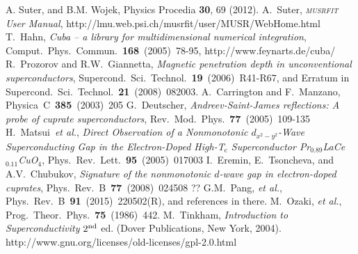 \documentclass[twoside]{article}
\newcommand{\musrfit}{\textsc{musrfit}\xspace}
\begin{document}

\begin{thebibliography}{1}

 A. Suter, and B.M. Wojek, Physics Procedia \textbf{30}, 69 (2012). 
                  A.~Suter, \textit{\musrfit User Manual}, http://lmu.web.psi.ch/musrfit/user/MUSR/WebHome.html
 T.~Hahn, \textit{Cuba -- a library for multidimensional numerical integration}, Comput.~Phys.~Commun.~\textbf{168}~(2005)~78-95, http://www.feynarts.de/cuba/
 R.~Prozorov and R.W.~Giannetta, \textit{Magnetic penetration depth in unconventional superconductors}, Supercond.\ Sci.\ Technol.\ \textbf{19}~(2006)~R41-R67, and Erratum in Supercond.\ Sci.\ Technol.\ \textbf{21}~(2008)~082003.
 A.~Carrington and F.~Manzano, Physica~C~\textbf{385}~(2003)~205
 G.~Deutscher, \textit{Andreev-Saint-James reflections: A probe of cuprate superconductors}, Rev.~Mod.~Phys.~\textbf{77}~(2005)~109-135
 H.~Matsui~\textit{et al.}, \textit{Direct Observation of a Nonmonotonic $d_{x^2-y^2}$-Wave Superconducting Gap in the Electron-Doped High-T$_{\mathrm c}$ Superconductor Pr$_{0.89}$LaCe$_{0.11}$CuO$_4$}, Phys.~Rev.~Lett.~\textbf{95}~(2005)~017003
 I.~Eremin, E.~Tsoncheva, and A.V.~Chubukov, \textit{Signature of the nonmonotonic $d$-wave gap in electron-doped cuprates}, Phys.~Rev.~B~\textbf{77}~(2008)~024508
 ??
 G.M.~Pang, \emph{et al.}, Phys.~Rev.~B~\textbf{91}~(2015)~220502(R), and references in there.
 M.~Ozaki, \emph{et al.}, Prog.~Theor.~Phys.~\textbf{75}~(1986)~442.
 M.~Tinkham, \textit{Introduction to Superconductivity} $2^{\rm nd}$ ed. (Dover Publications, New York, 2004).
 http://www.gnu.org/licenses/old-licenses/gpl-2.0.html

\end{thebibliography}
\end{document}
